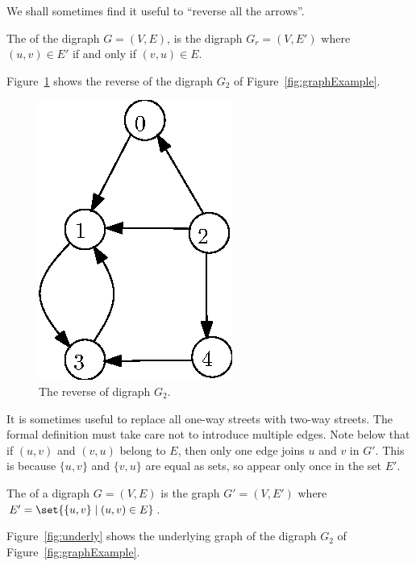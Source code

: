 We shall sometimes find it useful to ``reverse all the arrows''.

\begin{Definition}
The  of the digraph $G = (V, E)$, is the digraph $G_r = (V, E')$ where $(u, v)\in E'$ if and only if $(v, u)\in E$.
\end{Definition}

\begin{Example}
Figure~\ref{fig:reverse} shows the reverse of the digraph $G_2$ of Figure~\ref{fig:graphExample}.
\end{Example}

\begin{figure}[h]
\begin{center}
\includegraphics{figs/wReverse.eps}
\end{center}
\caption{The reverse of digraph $G_2$.}
\label{fig:reverse}
\end{figure}

It is sometimes useful to replace all one-way streets with two-way
streets. The formal definition must take care not to introduce multiple
edges. Note below that if $(u, v)$ and $(v, u)$ belong to $E$, then only
one edge joins $u$ and $v$ in $G'$.  This is because $\{u, v\}$ and
$\{v, u\}$ are equal as sets, so appear only once in the set $E'$.

\begin{Definition}
The  of a digraph $G = (V, E)$ is the graph 
$G' = (V, E')$ where $E' = \set{\{u, v\} \mid (u, v)\in E}$.
\end{Definition}

\begin{Example}
Figure~\ref{fig:underly} shows the underlying graph of the digraph 
$G_2$ of Figure~\ref{fig:graphExample}.
\end{Example}

